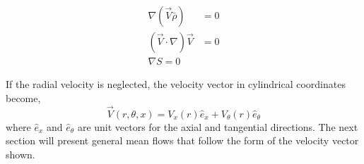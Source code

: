 \begin{align}
    \nabla (\vec{V} \bar{\rho}) &=  0 \\
(\vec{V}\cdot \nabla) \vec{V} &=  0\\
\nabla S = 0
\end{align}
\[\]

If the radial velocity is neglected, the velocity vector in cylindrical coordinates 
become,
\[\vec{V}(r,\theta,x) = V_x(r) \hat{e}_x + V_{\theta} (r) \hat{e}_{\theta} \] 
where $\hat{e}_x$ and $\hat{e}_{\theta}$ are unit vectors for the axial and 
tangential directions. The next section will present general mean flows that 
follow the form of the velocity vector shown. 

 

